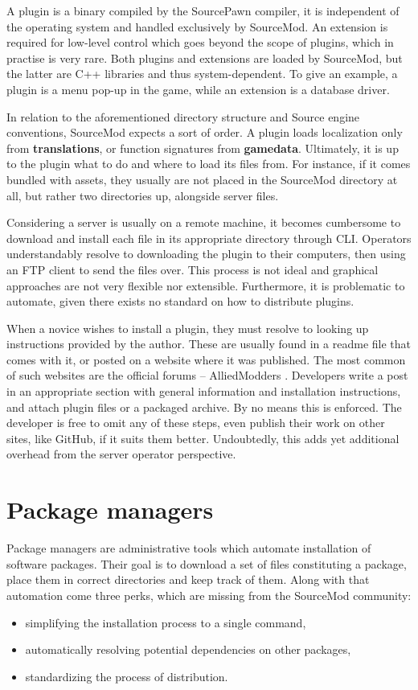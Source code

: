 A plugin is a binary compiled by the SourcePawn compiler, it is independent of the operating system and handled exclusively by SourceMod.
An extension is required for low-level control which goes beyond the scope of plugins, which in practise is very rare.
Both plugins and extensions are loaded by SourceMod, but the latter are C++ libraries and thus system-dependent.
To give an example, a plugin is a menu pop-up in the game, while an extension is a database driver.

In relation to the aforementioned directory structure and Source engine conventions, SourceMod expects a sort of order.
A plugin loads localization only from \textbf{translations}, or function signatures from \textbf{gamedata}.
Ultimately, it is up to the plugin what to do and where to load its files from.
For instance, if it comes bundled with assets, they usually are not placed in the SourceMod directory at all, but rather two directories up, alongside server files.

Considering a server is usually on a remote machine, it becomes cumbersome to download and install each file in its appropriate directory through CLI.
Operators understandably resolve to downloading the plugin to their computers, then using an FTP client to send the files over.
This process is not ideal and graphical approaches are not very flexible nor extensible.
Furthermore, it is problematic to automate, given there exists no standard on how to distribute plugins.

When a novice wishes to install a plugin, they must resolve to looking up instructions provided by the author.
These are usually found in a readme file that comes with it, or posted on a website where it was published.
The most common of such websites are the official forums -- AlliedModders \cite{alliedmodders-plugins}.
Developers write a post in an appropriate section with general information and installation instructions, and attach plugin files or a packaged archive.
By no means this is enforced.
The developer is free to omit any of these steps, even publish their work on other sites, like GitHub, if it suits them better.
Undoubtedly, this adds yet additional overhead from the server operator perspective.

\section{Package managers}

Package managers are administrative tools which automate installation of software packages.
Their goal is to download a set of files constituting a package, place them in correct directories and keep track of them.
Along with that automation come three perks, which are missing from the SourceMod community:
\begin{itemize}
    \item simplifying the installation process to a single command,
    \item automatically resolving potential dependencies on other packages,
    \item standardizing the process of distribution.
\end{itemize}

